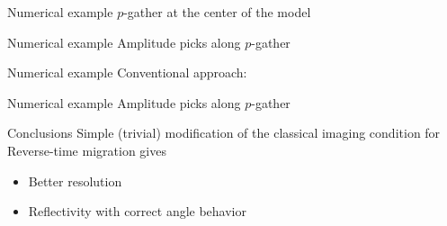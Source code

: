 \documentclass[xcolor=dvipsnames,notes]{beamer}
\begin{document}
\begin{frame}{Numerical example}
$p$-gather at the center of the model
\begin{figure}
\end{figure}
\end{frame}
\begin{frame}{Numerical example}
Amplitude picks along $p$-gather
\begin{figure}
\end{figure}
\end{frame}
\begin{frame}{Numerical example}
Conventional approach:
\begin{figure}
\end{figure}
\end{frame}
\begin{frame}{Numerical example}
Amplitude picks along $p$-gather
\begin{figure}
\end{figure}
\end{frame}
\begin{frame}{Conclusions}
Simple (trivial) modification of the classical
imaging condition for Reverse-time migration gives
\begin{itemize}
  \item Better resolution
  \item Reflectivity with correct angle behavior
\end{itemize}
\end{frame}
\end{document}
